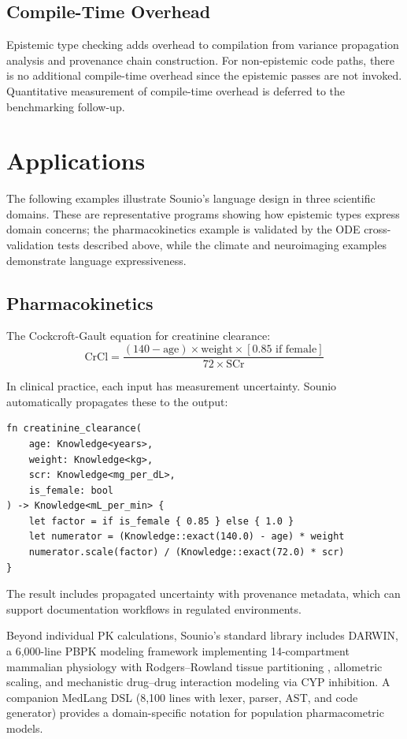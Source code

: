 \documentclass[11pt,a4paper]{article}
\begin{document}
\subsection{Compile-Time Overhead}

Epistemic type checking adds overhead to compilation from variance
propagation analysis and provenance chain construction. For non-epistemic
code paths, there is no additional compile-time overhead since the
epistemic passes are not invoked. Quantitative measurement of compile-time
overhead is deferred to the benchmarking follow-up.

\section{Applications}
\label{sec:applications}

The following examples illustrate Sounio's language design in three
scientific domains. These are representative programs showing how
epistemic types express domain concerns; the pharmacokinetics example
is validated by the ODE cross-validation tests described above, while
the climate and neuroimaging examples demonstrate language expressiveness.

\subsection{Pharmacokinetics}

The Cockcroft-Gault equation for creatinine clearance:
\[
  \text{CrCl} = \frac{(140 - \text{age}) \times \text{weight} \times [0.85 \text{ if female}]}{72 \times \text{SCr}}
\]

In clinical practice, each input has measurement uncertainty. Sounio
automatically propagates these to the output:

\begin{lstlisting}[caption={GUM-compliant drug dosing}]
fn creatinine_clearance(
    age: Knowledge<years>,
    weight: Knowledge<kg>,
    scr: Knowledge<mg_per_dL>,
    is_female: bool
) -> Knowledge<mL_per_min> {
    let factor = if is_female { 0.85 } else { 1.0 }
    let numerator = (Knowledge::exact(140.0) - age) * weight
    numerator.scale(factor) / (Knowledge::exact(72.0) * scr)
}
\end{lstlisting}

The result includes propagated uncertainty with provenance metadata,
which can support documentation workflows in regulated environments.

Beyond individual PK calculations, Sounio's standard library includes
DARWIN, a 6,000-line PBPK modeling framework implementing 14-compartment
mammalian physiology with Rodgers--Rowland tissue partitioning
\citep{rodgers2005tissue}, allometric scaling, and mechanistic drug--drug
interaction modeling via CYP inhibition. A companion MedLang DSL
(8,100 lines with lexer, parser, AST, and code generator) provides a
domain-specific notation for population pharmacometric models.
\end{document}
